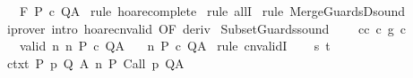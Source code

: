 \begin{isabellebody}
\ \ \ {\isachardoublequoteopen}{\isasymGamma}{\isacharcomma}{\isasymTheta}{\isasymturnstile}\isactrlbsub {\isacharslash}F\isactrlesub \ P\ c\ Q{\isacharcomma}A{\isachardoublequoteclose}\isanewline
%
\isadelimproof
%
\endisadelimproof
%
\isatagproof
{}\isamarkupfalse%
\ {\isacharparenleft}rule\ hoare{\isacharunderscore}complete{\isacharprime}{\isacharparenright}\isanewline
{}\isamarkupfalse%
\ {\isacharparenleft}rule\ allI{\isacharparenright}\isanewline
{}\isamarkupfalse%
\ {\isacharparenleft}rule\ MergeGuardsD{\isacharunderscore}sound{\isacharparenright}\isanewline
{}\isamarkupfalse%
\ {\isacharparenleft}iprover\ intro{\isacharcolon}\ hoare{\isacharunderscore}cnvalid\ {\isacharbrackleft}OF\ deriv{\isacharbrackright}{\isacharparenright}\isanewline
{}\isamarkupfalse%
%
\endisatagproof
{\isafoldproof}%
%
\isadelimproof
\isanewline
%
\endisadelimproof
\isanewline
\isanewline
{}\isamarkupfalse%
\ SubsetGuards{\isacharunderscore}sound{\isacharcolon}\ \isanewline
\ \ \ c{\isacharunderscore}c{\isacharprime}{\isacharcolon}\ {\isachardoublequoteopen}c\ {\isasymsubseteq}\isactrlsub g\ c{\isacharprime}{\isachardoublequoteclose}\isanewline
\ \ \ valid{\isacharcolon}\ {\isachardoublequoteopen}{\isasymforall}n{\isachardot}\ {\isasymGamma}{\isacharcomma}{\isasymTheta}{\isasymTurnstile}n{\isacharcolon}\isactrlbsub {\isacharslash}{\isacharbraceleft}{\isacharbraceright}\isactrlesub \ P\ c{\isacharprime}\ Q{\isacharcomma}A{\isachardoublequoteclose}\isanewline
\ \ \ {\isachardoublequoteopen}{\isasymGamma}{\isacharcomma}{\isasymTheta}{\isasymTurnstile}n{\isacharcolon}\isactrlbsub {\isacharslash}{\isacharbraceleft}{\isacharbraceright}\isactrlesub \ P\ c\ Q{\isacharcomma}A{\isachardoublequoteclose}\isanewline
%
\isadelimproof
%
\endisadelimproof
%
\isatagproof
{}\isamarkupfalse%
\ {\isacharparenleft}rule\ cnvalidI{\isacharparenright}\isanewline
\ \ \isamarkupfalse%
\ s\ t\isanewline
\ \ \isamarkupfalse%
\ ctxt{\isacharcolon}\ {\isachardoublequoteopen}{\isasymforall}{\isacharparenleft}P{\isacharcomma}\ p{\isacharcomma}\ Q{\isacharcomma}\ A{\isacharparenright}{\isasymin}{\isasymTheta}{\isachardot}\ {\isasymGamma}{\isasymTurnstile}n{\isacharcolon}\isactrlbsub {\isacharslash}{\isacharbraceleft}{\isacharbraceright}\isactrlesub \ P\ {\isacharparenleft}Call\ p{\isacharparenright}\ Q{\isacharcomma}A{\isachardoublequoteclose}\ \isanewline
\ \ \isamarkupfalse%

\end{isabellebody}
